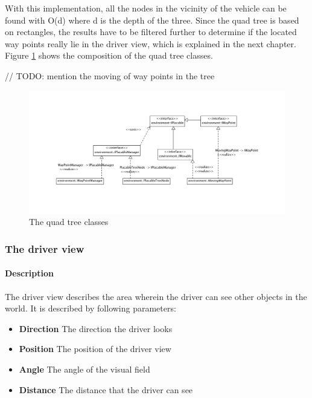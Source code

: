 \noindent With this implementation, all the nodes in the vicinity of the vehicle can be
found with O(d) where d is the depth of the three. Since the quad tree is based
on rectangles, the results have to be filtered further to determine if the located
way points really lie in the driver view, which is explained in the next 
chapter.\\

\noindent Figure \ref{fig:quadTreeClasses} shows the composition of the quad tree classes.

// TODO: mention the moving of way points in the tree

\begin{figure}[H]
\begin{center}
\includegraphics[width=\textwidth]{images/waypointsmanager.png}
\end{center}
\caption{The quad tree classes}
\label{fig:quadTreeClasses}
\end{figure}

\subsubsection{The driver view}
\label{sec:driverView}

\paragraph{Description}

The driver view describes the area wherein the driver can see other objects in
the world. It is described by following parameters:

\begin{itemize}
\item \textbf{Direction} The direction the driver looks
\item \textbf{Position} The position of the driver view 
\item \textbf{Angle} The angle of the visual field
\item \textbf{Distance} The distance that the driver can see
\end{itemize}

